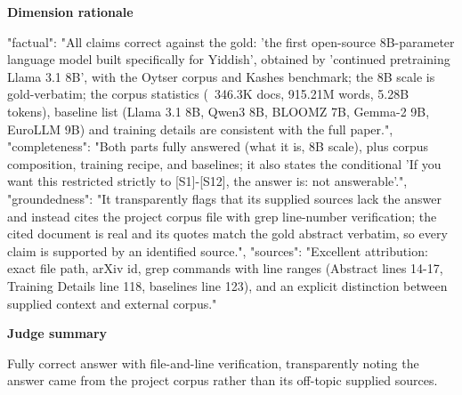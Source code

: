 \documentclass[10pt]{article}
\begin{document}
\textbf{Dimension rationale}
\begin{EvidenceText}
{
  "factual": "All claims correct against the gold: 'the first open-source 8B-parameter language model built specifically for Yiddish', obtained by 'continued pretraining Llama 3.1 8B', with the Oytser corpus and Kashes benchmark; the 8B scale is gold-verbatim; the corpus statistics (~346.3K docs, 915.21M words, 5.28B tokens), baseline list (Llama 3.1 8B, Qwen3 8B, BLOOMZ 7B, Gemma-2 9B, EuroLLM 9B) and training details are consistent with the full paper.",
  "completeness": "Both parts fully answered (what it is, 8B scale), plus corpus composition, training recipe, and baselines; it also states the conditional 'If you want this restricted strictly to [S1]-[S12], the answer is: not answerable'.",
  "groundedness": "It transparently flags that its supplied sources lack the answer and instead cites the project corpus file with grep line-number verification; the cited document is real and its quotes match the gold abstract verbatim, so every claim is supported by an identified source.",
  "sources": "Excellent attribution: exact file path, arXiv id, grep commands with line ranges (Abstract lines 14-17, Training Details line 118, baselines line 123), and an explicit distinction between supplied context and external corpus."
}
\end{EvidenceText}

\textbf{Judge summary}
\begin{EvidenceText}
Fully correct answer with file-and-line verification, transparently noting the answer came from the project corpus rather than its off-topic supplied sources.
\end{EvidenceText}
\end{document}
